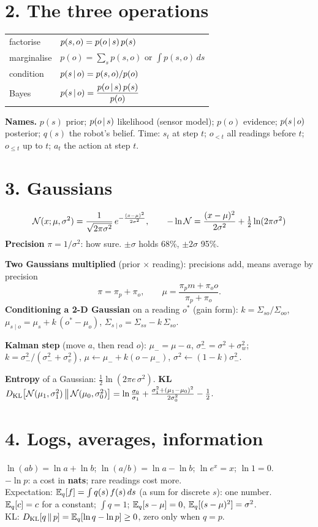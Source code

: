 \documentclass[10pt]{article}
\begin{document}
\newpage

\section*{2. The three operations}
\renewcommand{\arraystretch}{1.5}
\begin{tabular}{@{}ll@{}}
factorise & $p(s,o) = p(o\,|\, s)\,p(s)$ \\
marginalise & $p(o) = \sum_s p(s,o)$ \;or\; $\int p(s,o)\,ds$ \\
condition & $p(s\,|\, o) = p(s,o)/p(o)$ \\
Bayes & $p(s\,|\, o) = \dfrac{p(o\,|\, s)\,p(s)}{p(o)}$ \\
\end{tabular}

\textbf{Names.} $p(s)$ prior;\; $p(o\,|\, s)$ likelihood (sensor model);\;
$p(o)$ evidence;\; $p(s\,|\, o)$ posterior;\; $q(s)$ the robot's belief.
Time: $s_t$ at step $t$;\; $o_{<t}$ all readings before $t$;\; $o_{\le t}$ up to $t$;\;
$a_t$ the action at step $t$.

\section*{3. Gaussians}
\[
\mathcal{N}(x;\mu,\sigma^2) = \frac{1}{\sqrt{2\pi\sigma^2}}\,e^{-\frac{(x-\mu)^2}{2\sigma^2}},
\qquad -\ln\mathcal{N} = \frac{(x-\mu)^2}{2\sigma^2} + \tfrac12\ln(2\pi\sigma^2)
\]
\textbf{Precision} $\pi = 1/\sigma^2$: how sure. $\pm\sigma$ holds 68\%, $\pm2\sigma$ 95\%.

\textbf{Two Gaussians multiplied} (prior $\times$ reading): precisions add, means average by precision
\[
\pi = \pi_p + \pi_o, \qquad \mu = \frac{\pi_p m + \pi_o o}{\pi_p + \pi_o}.
\]
\textbf{Conditioning a 2-D Gaussian} on a reading $o^*$ (gain form):
$k = \Sigma_{so}/\Sigma_{oo}$,\; $\mu_{s\mid o} = \mu_s + k\,(o^* - \mu_o)$,\; $\Sigma_{s\mid o} = \Sigma_{ss} - k\,\Sigma_{so}$.

\textbf{Kalman step} (move $a$, then read $o$): $\mu_- = \mu - a$, $\sigma_-^2 = \sigma^2 + \sigma_w^2$;\;
$k = \sigma_-^2/(\sigma_-^2+\sigma_v^2)$, $\mu \leftarrow \mu_- + k(o-\mu_-)$, $\sigma^2 \leftarrow (1-k)\sigma_-^2$.

\textbf{Entropy} of a Gaussian: $\tfrac12\ln(2\pi e\,\sigma^2)$.\;
\textbf{KL} $D_{\mathrm{KL}}\!\left[\mathcal{N}(\mu_1,\sigma_1^2)\,\middle\|\,\mathcal{N}(\mu_0,\sigma_0^2)\right] = \ln\frac{\sigma_0}{\sigma_1} + \frac{\sigma_1^2 + (\mu_1-\mu_0)^2}{2\sigma_0^2} - \frac12$.

\section*{4. Logs, averages, information}
$\ln(ab) = \ln a + \ln b$;\; $\ln(a/b) = \ln a - \ln b$;\; $\ln e^x = x$;\; $\ln 1 = 0$.\\
$-\ln p$: a cost in \textbf{nats}; rare readings cost more.\\
Expectation: $\mathbb{E}_q[f] = \int q(s)\,f(s)\,ds$ (a sum for discrete $s$): one number.\\
$\mathbb{E}_q[c] = c$ for a constant;\; $\int q = 1$;\; $\mathbb{E}_q[s-\mu] = 0$,\; $\mathbb{E}_q[(s-\mu)^2] = \sigma^2$.\\
KL: $D_{\mathrm{KL}}\!\left[q\,\middle\|\,p\right] = \mathbb{E}_q[\ln q - \ln p] \ge 0$, zero only when $q = p$.
\end{document}
